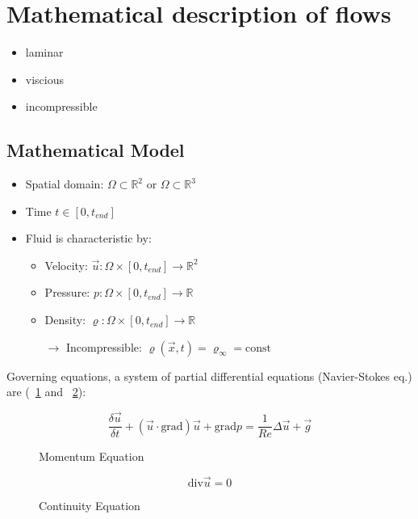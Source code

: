 \section{Mathematical description of flows}
\begin{itemize}
	\item laminar
	\item viscious
	\item incompressible
\end{itemize}
\subsection{Mathematical Model}
\begin{itemize}
	\item Spatial domain: $\Omega \subset  \mathds{R}^2$ or $\Omega \subset  \mathds{R}^3$
	\item Time $t \in [0, t_{end}]$
	\item Fluid is characteristic by:
	\begin{itemize}
		\item Velocity: $\vec{u} : \Omega \times [0, t_{end}] \rightarrow \mathds{R}^2$
		\item Pressure: $p : \Omega \times [0, t_{end}] \rightarrow \mathds{R}$
		\item Density: $ \varrho : \Omega \times [0, t_{end}] \rightarrow \mathds{R}$
		\item[$\rightarrow$] Incompressible: $\varrho(\vec{x},t) = \varrho_\infty = \text{const}$
	\end{itemize}
\end{itemize}
Governing equations, a system of partial differential equations (Navier-Stokes eq.) are (~\ref{fig:momentum} and ~\ref{fig:cont-eq}):

\begin{figure}[H]
	\centering
	\[\frac{\delta \vec{u}}{\delta t} + ( \vec{u} \cdot \text{grad}) \vec{u} + \text{grad} p = \frac{1}{Re} \Delta \vec{u} + \vec{g}\]
	\renewcommand{\thefigure}{2.1.a}
    \caption{Momentum Equation}
	\label{fig:momentum}
\end{figure}
\begin{figure}[H]
	\centering
	\[\text{div} \vec{u} = 0\]
	\renewcommand{\thefigure}{2.1.b}
    \caption{Continuity Equation}
	\label{fig:cont-eq}
\end{figure}

